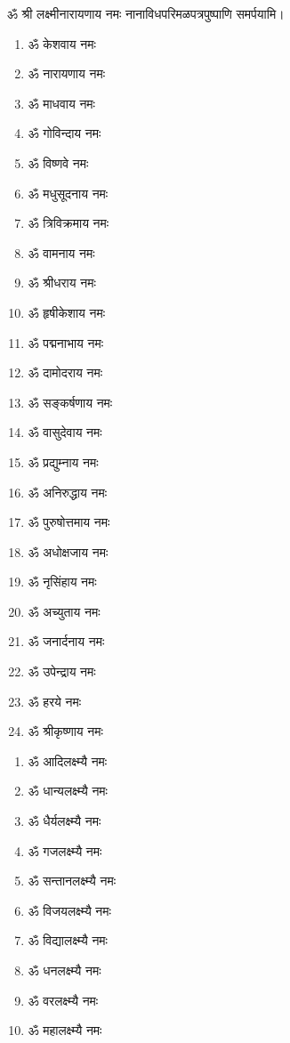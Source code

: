 \begin{center}
ॐ श्री लक्ष्मीनारायणाय नमः नानाविधपरिमळपत्रपुष्पाणि समर्पयामि। \medskip

\clearpage
{}

\begin{multicols}{2}
\begin{enumerate}
\item ॐ केशवाय नमः
\item ॐ नारायणाय नमः
\item ॐ माधवाय नमः
\item ॐ गोविन्दाय नमः
\item ॐ विष्णवे नमः 
\item ॐ मधुसूदनाय नमः
\item ॐ त्रिविक्रमाय नमः
\item ॐ वामनाय नमः
\item ॐ श्रीधराय नमः
\item ॐ हृषीकेशाय नमः
\item ॐ पद्मनाभाय नमः
\item ॐ दामोदराय नमः
\item ॐ सङ्कर्षणाय नमः
\item ॐ वासुदेवाय नमः
\item ॐ प्रद्युम्नाय नमः
\item ॐ अनिरुद्धाय नमः
\item ॐ पुरुषोत्तमाय नमः
\item ॐ अधोक्षजाय नमः
\item ॐ नृसिंहाय नमः
\item ॐ अच्युताय नमः
\item ॐ जनार्दनाय नमः
\item ॐ उपेन्द्राय नमः 
\item ॐ हरये नमः
\item ॐ श्रीकृष्णाय नमः
\end{enumerate}
\end{multicols}


\begin{multicols}{2}
\begin{enumerate}
\item ॐ आदिलक्ष्म्यै नमः
\item ॐ धान्यलक्ष्म्यै नमः
\item ॐ धैर्यलक्ष्म्यै नमः
\item ॐ गजलक्ष्म्यै नमः
\item ॐ सन्तानलक्ष्म्यै नमः
\item ॐ विजयलक्ष्म्यै नमः
\item ॐ विद्यालक्ष्म्यै नमः
\item ॐ धनलक्ष्म्यै नमः
\item ॐ वरलक्ष्म्यै नमः
\item ॐ महालक्ष्म्यै नमः 
\end{enumerate}
\end{multicols}


\end{center}
